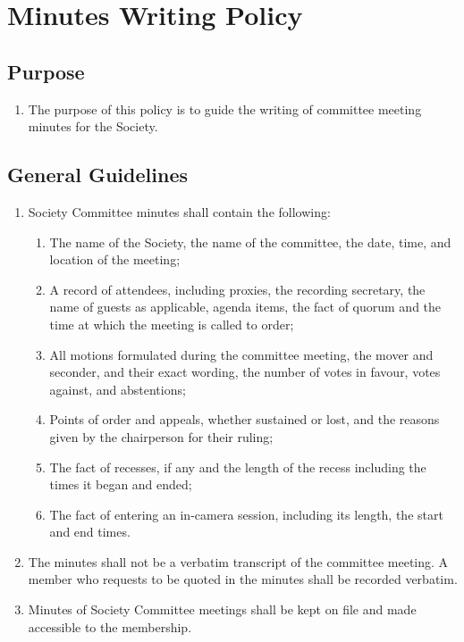 \section{Minutes Writing Policy}

\subsection{Purpose}
\begin{enumerate} [align=left]
\item The purpose of this policy is to guide the writing of committee meeting minutes for the Society.
\end{enumerate}

\subsection{General Guidelines}
\begin{enumerate} [align=left]
\item Society Committee minutes shall contain the following:
\begin{enumerate} [label*=\arabic*., align=left]
\item The name of the Society, the name of the committee, the date, time, and location of the meeting;
\item A record of attendees, including proxies, the recording secretary, the name of guests as applicable, agenda items, the fact of quorum and the time at which the meeting is called to order;
\item All motions formulated during the committee meeting, the mover and seconder, and their exact wording, the number of votes in favour, votes against, and abstentions;
\item Points of order and appeals, whether sustained or lost, and the reasons given by the chairperson for their ruling;
\item The fact of recesses, if any and the length of the recess including the times it began and ended;
\item The fact of entering an in-camera session, including its length, the start and end
times.
\end{enumerate}
\item The minutes shall not be a verbatim transcript of the committee meeting. A member who requests to be quoted in the minutes shall be recorded verbatim.
\item Minutes of Society Committee meetings shall be kept on file and made accessible to the membership.
\end{enumerate}